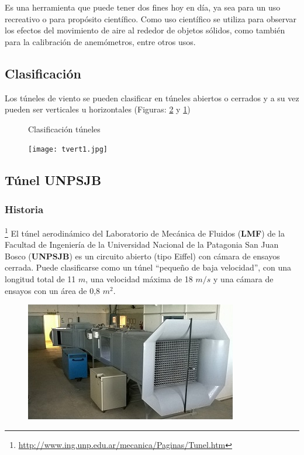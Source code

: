 


\begin{tcolorbox}[colback=blue!5!white,colframe=blue!75!black,title=Túnel de viento]
Es una herramienta que puede tener dos fines hoy en día, ya sea para un uso recreativo o para propósito científico.
Como uso científico se utiliza para observar los efectos del movimiento de aire al rededor de objetos sólidos, como también para la calibración de anemómetros, entre otros usos.
\end{tcolorbox}


\subsection{Clasificación}
Los túneles de viento se pueden clasificar en túneles abiertos o cerrados y a su vez pueden ser verticales u horizontales (Figuras: \ref{fig:tunelRec} y \ref{fig:abierto})


\begin{figure}[htbp]
    \centering
    \caption{Clasificación túneles} \label{fig:abierto}
    \end{figure}

\begin{figure}[htb]
	\centering
	\texttt{[image: tvert1.jpg]}
	\label{fig:tunelRec}
\end{figure}

\subsection{Túnel UNPSJB}

\subsubsection{Historia}
\footnote{\url{http://www.ing.unp.edu.ar/mecanica/Paginas/Tunel.htm}} 
	El túnel aerodinámico del Laboratorio de Mecánica de Fluidos (\textbf{LMF}) de la Facultad de Ingeniería de la Universidad Nacional de la Patagonia San Juan Bosco (\textbf{UNPSJB}) es un circuito abierto (tipo Eiffel) con cámara de ensayos cerrada. Puede clasificarse como un túnel “pequeño de baja velocidad”, con una longitud total de 11 $m$, una velocidad máxima de 18 $m/s$ y una cámara de ensayos con un área de 0,8 $m^2$.
	
	\begin{figure}[htb]
		\centering
		\includegraphics[scale=0.9]{tunel_unpsjb.JPG}
		\label{fig:tunelUni}
	\end{figure}
	
